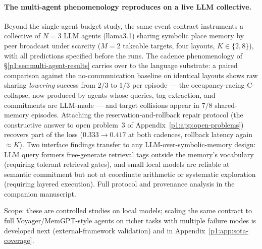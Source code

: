 \documentclass{article}
\begin{document}
\paragraph{The multi-agent phenomenology reproduces on a live LLM collective.}
Beyond the single-agent budget study, the same event contract
instruments a collective of $N{=}3$ LLM agents (llama3.1) sharing
symbolic place memory by peer broadcast under scarcity ($M{=}2$
takeable targets, four layouts, $K\in\{2,8\}$), with all predictions
specified before the runs. The cadence phenomenology of
\S\ref{p1:sec:multi-agent-results} carries over to the language
substrate: a paired comparison against the no-communication baseline
on identical layouts shows raw sharing \emph{lowering} success from
$2/3$ to $1/3$ per episode --- the occupancy-racing C-collapse, now
produced by agents whose queries, tag extraction, and commitments are
LLM-made --- and target collisions appear in $7/8$ shared-memory
episodes. Attaching the reservation-and-rollback repair protocol (the
constructive answer to open problem~3 of
Appendix~\ref{p1:app:open-problems}) recovers part of the loss
($0.333\to0.417$ at both cadences, rollback latency again
${\approx}K$). Two interface findings transfer to any
LLM-over-symbolic-memory design: LLM query formers free-generate
retrieval tags outside the memory's vocabulary (requiring tolerant
retrieval gates), and small local models are reliable at semantic
commitment but not at coordinate arithmetic or systematic exploration
(requiring layered execution). Full protocol and provenance analysis
in the companion manuscript.

Scope: these are controlled studies on local models; scaling the same contract to full Voyager/MemGPT-style agents on richer tasks with multiple failure modes is developed next (external-framework validation) and in Appendix~\ref{p1:app:sota-coverage}.
\end{document}
